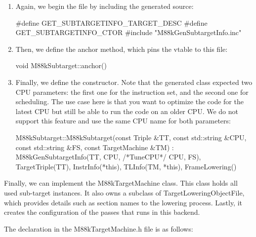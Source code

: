 \begin{enumerate}
\item
Again, we begin the file by including the generated source:

\begin{cpp}
#define GET_SUBTARGETINFO_TARGET_DESC
#define GET_SUBTARGETINFO_CTOR
#include "M88kGenSubtargetInfo.inc"
\end{cpp}

\item
Then, we define the anchor method, which pins the vtable to this file:

\begin{cpp}
void M88kSubtarget::anchor() {}
\end{cpp}

\item
Finally, we define the constructor. Note that the generated class expected two CPU parameters: the first one for the instruction set, and the second one for scheduling. The use case here is that you want to optimize the code for the latest CPU but still be able to run the code on an older CPU. We do not support this feature and use the same CPU name for both parameters:

\begin{cpp}
M88kSubtarget::M88kSubtarget(const Triple &TT,
                             const std::string &CPU,
                             const std::string &FS,
                             const TargetMachine &TM)
    : M88kGenSubtargetInfo(TT, CPU, /*TuneCPU*/ CPU, FS),
      TargetTriple(TT), InstrInfo(*this),
      TLInfo(TM, *this), FrameLowering() {}
\end{cpp}
\end{enumerate}


Finally, we can implement the M88kTargetMachine class. This class holds all used sub-target instances. It also owns a subclass of TargetLoweringObjectFile, which provides details such as section names to the lowering process. Lastly, it creates the configuration of the passes that runs in this backend.

The declaration in the M88kTargetMachine.h file is as follows:

